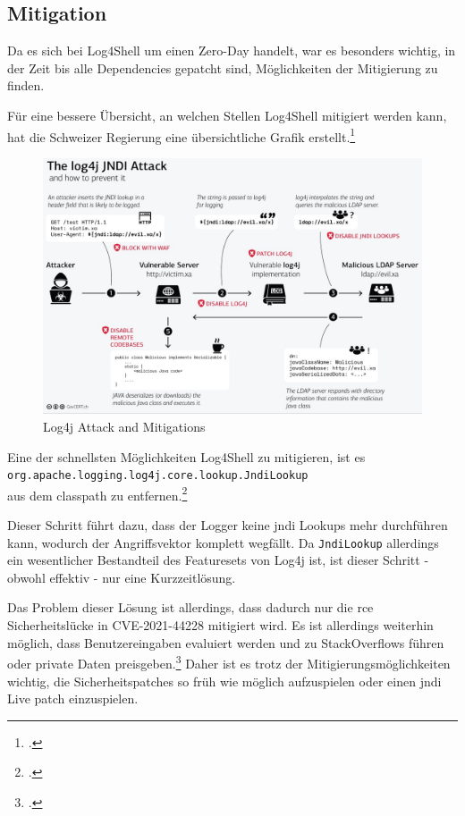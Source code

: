 
\clearpage
\subsection{Mitigation}\label{subsec:mitigation}
Da es sich bei Log4Shell um einen Zero-Day handelt, war es besonders wichtig, in der Zeit bis alle Dependencies gepatcht sind, Möglichkeiten der Mitigierung zu finden.

Für eine bessere Übersicht, an welchen Stellen Log4Shell mitigiert werden kann, hat die Schweizer Regierung eine übersichtliche Grafik erstellt.\footcite{schweizGov}

\begin{figure}[!htb]\label{fig:log4jattackgraphic}
    \begin{center}
        \includegraphics[width=\textwidth]{images/log4j_attack}
    \end{center}
    \caption{Log4j Attack and Mitigations}
\end{figure}

Eine der schnellsten Möglichkeiten Log4Shell zu mitigieren, ist es
\\ \verb|org.apache.logging.log4j.core.lookup.JndiLookup|\\
aus dem classpath zu entfernen.\footcite{redditThread}

Dieser Schritt führt dazu, dass der Logger keine \gls{jndi} Lookups mehr durchführen kann, wodurch der Angriffsvektor komplett wegfällt.
Da \verb|JndiLookup| allerdings ein wesentlicher Bestandteil des Featuresets von Log4j ist, ist dieser Schritt - obwohl effektiv - nur eine Kurzzeitlösung.

Das Problem dieser Lösung ist allerdings, dass dadurch nur die \gls{rce} Sicherheitslücke in CVE-2021-44228 mitigiert wird.
Es ist allerdings weiterhin möglich, dass Benutzereingaben evaluiert werden und zu StackOverflows führen oder private Daten preisgeben.\footcite{log4jSecurity}
Daher ist es trotz der Mitigierungsmöglichkeiten wichtig, die Sicherheitspatches so früh wie möglich aufzuspielen oder einen \gls{jndi} Live patch einzuspielen.
